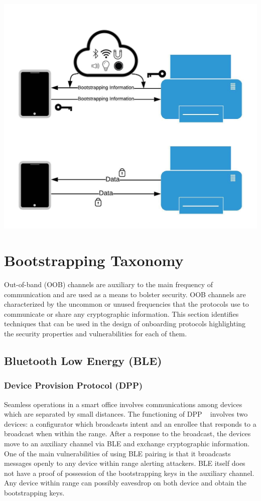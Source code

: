 \usepackage{graphicx}
\graphicspath{ {./images/} }
\includegraphics[scale=0.15]{pic}
\section{Bootstrapping Taxonomy}

Out-of-band (OOB) channels are auxiliary to the main frequency of communication and are used as a means to bolster security.
OOB channels are characterized by the uncommon or unused frequencies that the protocols use to communicate or share any cryptographic information.
This section identifies techniques that can be used in the design of onboarding protocols highlighting the security properties and vulnerabilities for each of them. 

\subsection{Bluetooth Low Energy (BLE)}
\subsubsection{Device Provision Protocol (DPP)}
Seamless operations in a smart office involves communications among devices which are separated by small distances.
The functioning of DPP ~\cite{wifialliance} involves two devices: a configurator which broadcasts intent and an enrollee that responds to a broadcast when within the range.
After a response to the broadcast, the devices move to an auxiliary channel via BLE and exchange cryptographic information.
One of the main vulnerabilities of using BLE pairing is that it broadcasts messages openly to any device within range alerting attackers.
BLE itself does not have a proof of possession of the bootstrapping keys in the auxiliary channel.
Any device within range can possibly eavesdrop on both device and obtain the bootstrapping keys.


